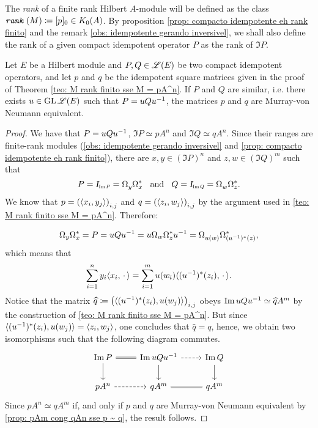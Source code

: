 \begin{definicao}
The \textit{rank} of a finite rank Hilbert $A$-module will be defined as the class $\texttt{\textit{rank}}\,(M) \coloneqq [p]_0 \in K_0(A)$. By proposition \ref{prop: compacto idempotente eh rank finito} and the remark \ref{obs: idempotente gerando inversivel}, we shall also define the rank of a given compact idempotent operator $P$ as the rank of $\Im P$.
\end{definicao}


\begin{lema}\label{lema: [P]_0 = [Q]_0 ---> [p]_0 = [q]_0}
    Let $E$ be a Hilbert module and $P, Q \in \mathscr L(E)$ be two compact idempotent operators, and let $p$ and $q$ be the idempotent square matrices given in the proof of Theorem \ref{teo: M rank finito sse M = pA^n}. If $P$ and $Q$ are similar, i.e. there exists $u \in \operatorname{GL} \mathscr L(E)$ such that $P = uQ{u}^{-1}$, the matrices $p$ and $q$ are Murray-von Neumann equivalent. 
    \begin{proof}
        We have that $P = uQ{u}^{-1}$, $\Im P \simeq pA^n$ and $\Im Q \simeq qA^n$. Since their ranges are finite-rank modules (\ref{obs: idempotente gerando inversivel} and \ref{prop: compacto idempotente eh rank finito}), there are $x,y \in (\Im P)^n$ and $z,w \in (\Im Q)^m$ such that 
        $$P = \sub\Id{\Im P} = \Omega_{y}^{\,}\Omega_x^* \e Q = \sub\Id{\Im Q} = \Omega_{w}^{\,}\Omega_z^*.$$ 
        We know that $p=\left(\langle {x_i},{y_j}\rangle\right)_{i,j}$ and $q=\left(\langle {z_i},{w_j}\rangle\right)_{i,j}$ by the argument used in \ref{teo: M rank finito sse M = pA^n}. Therefore:

        $$
        \Omega_y\Omega_x^* = P = uQ{u}^{-1} = u\Omega_{w}\Omega_z^*{u}^{-1} = \Omega_{u(w)}^{\,}\Omega_{({{u}^{-1}})^*(z)}^*, $$
        which means that
        $$\sum_{i=1}^n y_i \langle {x_i},{\operatorname{\,\cdot\,}}\rangle = \sum_{i=1}^m u(w_i)\langle {({u}^{-1})^*(z_i)},{\operatorname{\,\cdot\,}}\rangle.$$ 
        Notice that the matrix $\widehat q \coloneqq \left(\langle {({u}^{-1})^*(z_i)},{u(w_j)}\rangle\right)_{i,j}$ obeys $\operatorname{Im} uQ{u}^{-1} \simeq \widehat{q}A^m$ by the construction of \ref{teo: M rank finito sse M = pA^n}. But since $\langle {({u}^{-1})^*(z_i)},{u(w_j)}\rangle = \langle {z_i},{w_j}\rangle$, one concludes that $\widehat{q} = q$, hence, we obtain two isomorphisms such that the following diagram commutes.
        \begin{equation*}
\begin{tikzcd}
    \Im P \arrow[d]        & \Im uQu^{-1} \arrow[l, no head, equal] \arrow[d] \arrow[r, dashed] & \Im Q \arrow[d] \\
    pA^n \arrow[r, dashed] & qA^m \arrow[r, no head, equal]                                     & qA^m           
    \end{tikzcd}
        \end{equation*}
        Since $pA^n\simeq qA^m$ if, and only if $p$ and $q$ are Murray-von Neumann equivalent by \ref{prop: pAm cong qAn sse p ~ q}, the result follows. 
    \end{proof}   
\end{lema}

